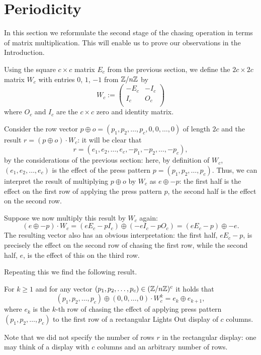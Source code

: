 \section{Periodicity}\label{sec:algebra}
In this section we reformulate the second stage of
the chasing operation in terms of matrix multiplication.
This will enable us to prove our observations in the Introduction.

Using the square $c\times c$ matrix $E_c$ from the previous
section, we define the $2c\times 2c$ matrix $W_{c}$ with entries $0$, $1$, $-1$ from
$\mathbb{Z}/n\mathbb{Z}$ by
\[
W_{c} := \left(
\begin{array}{cc}
  -E_{c} & -I_{c} \\
   I_{c} &  O_{c} \\
\end{array}
\right)
\]
where $O_c$ and $I_c$ are the $c\times c$ zero and
identity matrix.

Consider the row vector $p\oplus o=(p_1, p_2, \ldots, p_c, 0, 0, \ldots, 0)$
of length $2c$ and the result $r=(p\oplus o)\cdot W_c$: it will be clear that
$$r=(e_1, e_2, \ldots, e_c, -p_1, -p_2, \ldots, -p_c),$$
by the considerations of the previous section:
here, by definition of $W_c$,
$(e_1, e_2, \ldots, e_c)$ is the effect of
the press pattern $p=(p_1, p_2, \ldots, p_c)$. Thus, we can
interpret the result of multiplying $p\oplus o$ by $W_c$
as $e\oplus -p$: the first half is the effect on the first
row of applying the press pattern $p$, the second half is the
effect on the second row.

Suppose we now multiply this result by $W_c$ again:
$$(e\oplus -p)\cdot W_c=(eE_c-pI_c)\oplus (-eI_c-pO_c)=(eE_c-p)\oplus -e.$$
The resulting vector also has an obvious interpretation:
the first half, $eE_c-p$, is precisely the effect on
the second row of chasing the first row, while the
second half, $e$, is the effect of this on the third row.

Repeating this we find the following result.

\begin{lemma}
For $k\geq 1$ and for any vector
$(p_1, p_2, \ldots, p_c)\in (\mathbb{Z}/n\mathbb{Z})^c$ it holds that
$$(p_1, p_2, \ldots, p_c)\oplus (0, 0, \ldots,0)\cdot W_c^k=e_k\oplus e_{k+1},$$
where $e_k$ is the $k$-th row of chasing the effect of applying
press pattern $(p_1, p_2, \ldots, p_c)$ to the first row of a
rectangular Lights Out display of $c$ columns.
\end{lemma}
Note that we did not specify the number of rows $r$ in the rectangular
display: %
one may think of a display with $c$ columns and an arbitrary number
of rows.

